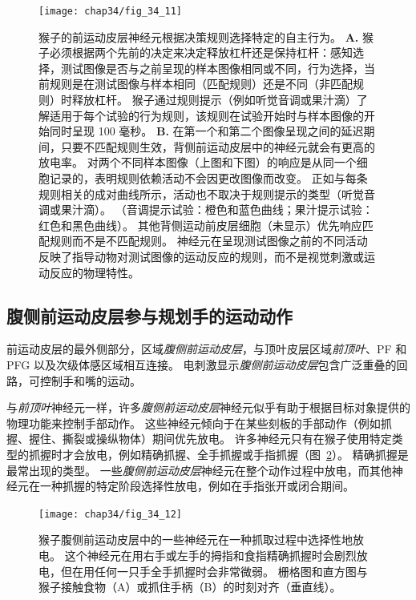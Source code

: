 \begin{figure}[htbp]
	\centering
	\texttt{[image: chap34/fig\_34\_11]}
	\caption{猴子的前运动皮层神经元根据决策规则选择特定的自主行为\cite{wallis2003rule}。
		\textbf{A.} 猴子必须根据两个先前的决定来决定释放杠杆还是保持杠杆：感知选择，测试图像是否与之前呈现的样本图像相同或不同，行为选择，当前规则是在测试图像与样本相同（匹配规则）还是不同（非匹配规则）时释放杠杆。
		猴子通过规则提示（例如听觉音调或果汁滴）了解适用于每个试验的行为规则，该规则在试验开始时与样本图像的开始同时呈现 100 毫秒。
		\textbf{B.} 在第一个和第二个图像呈现之间的延迟期间，只要不匹配规则生效，背侧前运动皮层中的神经元就会有更高的放电率。
		对两个不同样本图像（上图和下图）的响应是从同一个细胞记录的，表明规则依赖活动不会因更改图像而改变。
		正如与每条规则相关的成对曲线所示，活动也不取决于规则提示的类型（听觉音调或果汁滴）。
		（音调提示试验：橙色和蓝色曲线；果汁提示试验：红色和黑色曲线）。
		其他背侧运动前皮层细胞（未显示）优先响应匹配规则而不是不匹配规则。
		神经元在呈现测试图像之前的不同活动反映了指导动物对测试图像的运动反应的规则，而不是视觉刺激或运动反应的物理特性。}
	\label{fig:34_11}
\end{figure}



\subsection{腹侧前运动皮层参与规划手的运动动作}

前运动皮层的最外侧部分，区域\textit{腹侧前运动皮层}，与顶叶皮层区域\textit{前顶叶}、PF 和 PFG 以及次级体感区域相互连接。
电刺激显示\textit{腹侧前运动皮层}包含广泛重叠的回路，可控制手和嘴的运动。


与\textit{前顶叶}神经元一样，许多\textit{腹侧前运动皮层}神经元似乎有助于根据目标对象提供的物理功能来控制手部动作。
这些神经元倾向于在某些刻板的手部动作（例如抓握、握住、撕裂或操纵物体）期间优先放电。
许多神经元只有在猴子使用特定类型的抓握时才会放电，例如精确抓握、全手抓握或手指抓握（图~\ref{fig:34_12}）。
精确抓握是最常出现的类型。
一些\textit{腹侧前运动皮层}神经元在整个动作过程中放电，而其他神经元在一种抓握的特定阶段选择性放电，例如在手指张开或闭合期间。


\begin{figure}[htbp]
	\centering
	\texttt{[image: chap34/fig\_34\_12]}
	\caption{猴子腹侧前运动皮层中的一些神经元在一种抓取过程中选择性地放电。
		这个神经元在用右手或左手的拇指和食指精确抓握时会剧烈放电，但在用任何一只手全手抓握时会非常微弱。
		栅格图和直方图与猴子接触食物（A）或抓住手柄（B）的时刻对齐（垂直线）。}
	\label{fig:34_12}
\end{figure}


